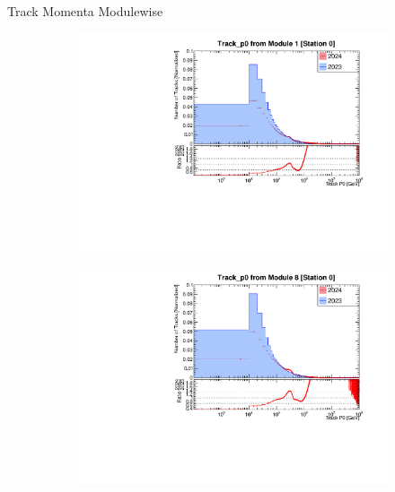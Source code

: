 \begin{frame}{Track Momenta Modulewise}
    \begin{figure}
        \centering
        \begin{subfigure}[t]{0.49\linewidth}
            \includegraphics[width=\linewidth]{./ModuleLevelPlots/Track_p0_st0_module1_linear.pdf}
        \end{subfigure}
        \begin{subfigure}[t]{0.49\linewidth}
            \includegraphics[width=\linewidth]{./ModuleLevelPlots/Track_p0_st0_module8_linear.pdf}
        \end{subfigure}


\end{figure}
\end{frame}
